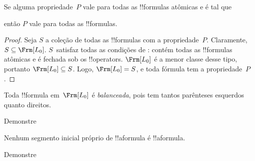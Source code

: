 \documentclass[../../../include/open-logic-section]{subfiles}
\begin{document}


\begin{thm}
  Se alguma propriedade~$P$ vale para todas as !!{formula}s atômicas e é
  tal que
  \begin{enumerate}
  \end{enumerate}
  então $P$ vale para todas as !!{formula}s.
\end{thm}

\begin{proof}
  Seja $S$ a coleção de todas as !!{formula}s com a
  propriedade~$P$. Claramente, $S \subseteq \Frm[L_0]$. $S$~satisfaz todas as
  condições de : contém todas as
  !!{formula}s atômicas e é fechada sob os !!{operator}s. $\Frm[L_0]$ é
  a menor classe desse tipo, portanto $\Frm[L_0] \subseteq S$. Logo, $\Frm[L_0] = S$, e
  toda fórmula tem a propriedade~$P$.
\end{proof}

\begin{prop}
   Toda !!{formula} em~$\Frm[L_0]$ é \emph{balanceada}, pois tem
   tantos parênteses esquerdos quanto direitos.
\end{prop}

\begin{prob}
Demonstre 
\end{prob}

\begin{prop} 
Nenhum segmento inicial próprio de !!a{formula} é !!a{formula}.
\end{prop}

\begin{prob}
  Demonstre 
\end{prob}
\end{document}
